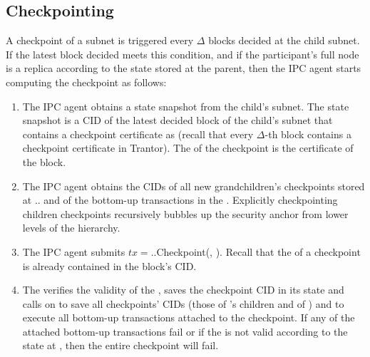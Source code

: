 \subsection{Checkpointing} 
\label{sec:refimplcheck} A checkpoint of a subnet  is triggered every $\Delta$ blocks decided at the child subnet. If the latest block decided meets this condition, and if the participant's full node is a replica according to the state stored at the parent, then the IPC agent starts computing the checkpoint as follows:
\begin{enumerate}
    \item The IPC agent obtains a state snapshot from the child's subnet. The state snapshot is a CID  of the latest decided block of the child's subnet that contains a checkpoint certificate as \pof  (recall that every $\Delta$-th block contains a checkpoint certificate in Trantor). The \pof of the checkpoint is the certificate of the block.
    \item The IPC agent obtains the CIDs of all new grandchildren's checkpoints stored at .\gw. and of the bottom-up transactions in the \bqueue {}. Explicitly checkpointing children checkpoints recursively bubbles up the security anchor from lower levels of the hierarchy.
    \item The IPC agent submits $tx=$..Checkpoint(, ). Recall that the \pof of a checkpoint is already contained in the block's CID.
    \item The  verifies the validity of the \pof, saves the checkpoint CID in its state and calls on \gw to save all checkpoints' CIDs (those of 's children and of ) and to execute all bottom-up transactions attached to the checkpoint. If any of the attached bottom-up transactions fail or if the \pof is not valid according to the state at , then the entire checkpoint will fail.
\end{enumerate}
